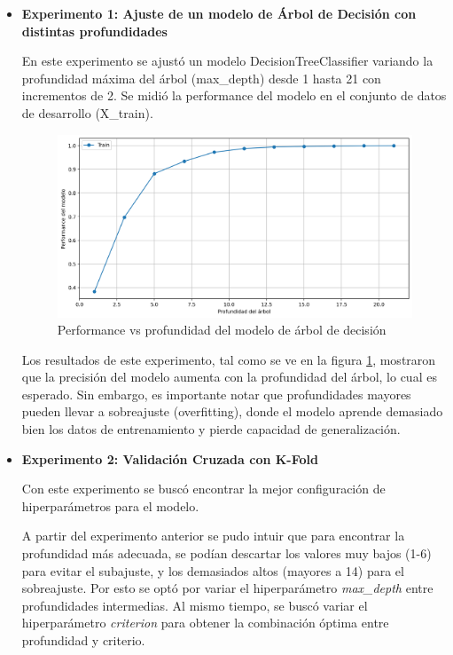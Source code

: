 \documentclass[11pt,a4paper, twocolumn]{article}
\begin{document}
\begin{itemize}
	\item[]
	\textbf{Experimento 1: Ajuste de un modelo de Árbol de Decisión con distintas profundidades}

En este experimento se ajustó un modelo DecisionTreeClassifier variando la profundidad máxima del árbol (max\_depth) desde 1 hasta 21 con incrementos de 2. Se midió la performance del modelo en el conjunto de datos de desarrollo (X\_train).

\begin{figure}[H]
	\centering
	\includegraphics[scale=0.6]{figuras/3b.png}
	\caption{Performance vs profundidad del modelo de árbol de decisión}
	\label{fig:3b}
\end{figure}

Los resultados de este experimento, tal como se ve en la figura \ref{fig:3b}, mostraron que la precisión del modelo aumenta con la profundidad del árbol, lo cual es esperado. Sin embargo, es importante notar que profundidades mayores pueden llevar a sobreajuste (overfitting), donde el modelo aprende demasiado bien los datos de entrenamiento y pierde capacidad de generalización. 

	\item[]
	\textbf{Experimento 2: Validación Cruzada con K-Fold }
 
Con este experimento se buscó encontrar la mejor configuración de hiperparámetros para el modelo. 

A partir del experimento anterior se pudo intuir que para encontrar la profundidad más adecuada, se podían descartar los valores muy bajos (1-6) para evitar el subajuste, y los demasiados altos (mayores a 14) para el sobreajuste. Por esto se optó por variar el hiperparámetro \textit{max\_depth} entre profundidades intermedias. 
Al mismo tiempo, se buscó variar el hiperparámetro \textit{criterion} para obtener la combinación óptima entre profundidad y criterio. 


\end{itemize}
\end{document}
